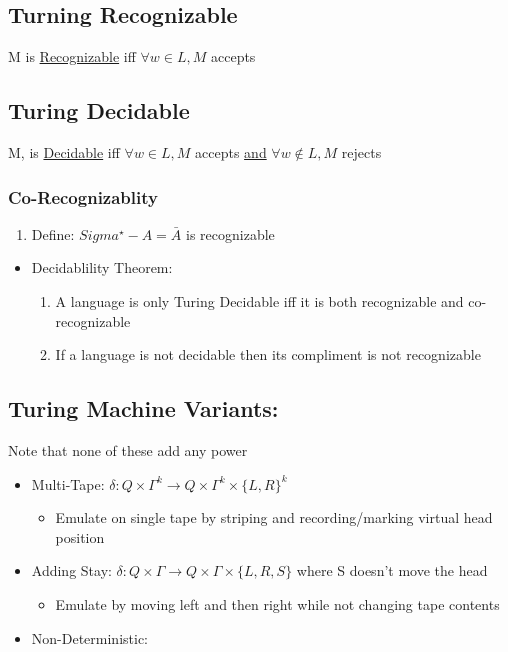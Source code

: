 \documentclass[11pt]{article}
\begin{document}
\subsection{Turning Recognizable}
\label{sec-5.3}

   M is \underline{Recognizable} iff $\forall w \in L, M$
   accepts
\subsection{Turing Decidable}
\label{sec-5.4}

   M, is \underline{Decidable} iff $\forall w \in L, M$ accepts \underline{and}
   $\forall w \notin L, M$ rejects
\subsubsection{Co-Recognizablity}
\label{sec-5.4.1}

\begin{enumerate}
\item Define: $Sigma^{\star} - A = \bar{A}$ is recognizable
\end{enumerate}
\begin{itemize}

\item Decidablility Theorem:\\
\label{sec-5.4.1.1}

\begin{enumerate}
\item A language is only Turing Decidable iff it is both recognizable
        and co-recognizable
\item If a language is not decidable then its compliment is not recognizable
\end{enumerate}
\end{itemize} %
\subsection{Turing Machine Variants:}
\label{sec-5.5}

   Note that none of these add any power
   
\begin{itemize}
\item Multi-Tape: $\delta:Q\times\Gamma^k\rightarrow Q\times\Gamma^k\times\{L,R\}^k$

\begin{itemize}
\item Emulate on single tape by striping and recording/marking virtual head position
\end{itemize}

\item Adding Stay: $\delta:Q\times\Gamma\rightarrow Q\times\Gamma\times\{L,R,S\}$ where S doesn't move the head

\begin{itemize}
\item Emulate by moving left and then right while not changing tape contents
\end{itemize}

\item Non-Deterministic:
\end{itemize}
\end{document}
